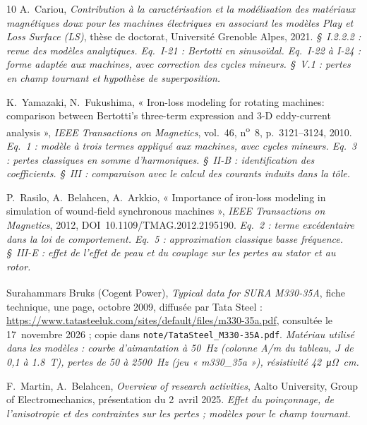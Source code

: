 \documentclass[11pt,a4paper]{article}
\begin{document}
\begin{thebibliography}{10}
 A.~Cariou, \emph{Contribution à la caractérisation et la modélisation des matériaux magnétiques doux pour les machines électriques en associant les modèles Play et Loss Surface (LS)}, thèse de doctorat, Université Grenoble Alpes, 2021. \emph{\S~I.2.2.2 : revue des modèles analytiques. Eq.~I-21 : Bertotti en sinusoïdal. Eq.~I-22 à I-24 : forme adaptée aux machines, avec correction des cycles mineurs. \S~V.1 : pertes en champ tournant et hypothèse de superposition.}

 K.~Yamazaki, N.~Fukushima, « Iron-loss modeling for rotating machines: comparison between Bertotti's three-term expression and 3-D eddy-current analysis », \emph{IEEE Transactions on Magnetics}, vol.~46, n\textsuperscript{o}~8, p.~3121--3124, 2010. \emph{Eq.~1 : modèle à trois termes appliqué aux machines, avec cycles mineurs. Eq.~3 : pertes classiques en somme d'harmoniques. \S~II-B : identification des coefficients. \S~III : comparaison avec le calcul des courants induits dans la tôle.}

 P.~Rasilo, A.~Belahcen, A.~Arkkio, « Importance of iron-loss modeling in simulation of wound-field synchronous machines », \emph{IEEE Transactions on Magnetics}, 2012, DOI~10.1109/TMAG.2012.2195190. \emph{Eq.~2 : terme excédentaire dans la loi de comportement. Eq.~5 : approximation classique basse fréquence. \S~III-E : effet de l'effet de peau et du couplage sur les pertes au stator et au rotor.}

 Surahammars Bruks (Cogent Power), \emph{Typical data for SURA\textsuperscript{\textregistered} M330-35A}, fiche technique, une page, octobre 2009, diffusée par Tata Steel : \url{https://www.tatasteeluk.com/sites/default/files/m330-35a.pdf}, consultée le 17~novembre 2026 ; copie dans \texttt{note/TataSteel\_M330-35A.pdf}. \emph{Matériau utilisé dans les modèles : courbe d'aimantation à \SI{50}{\hertz} (colonne A/m du tableau, $J$ de 0,1 à \SI{1.8}{\tesla}), pertes de 50 à \SI{2500}{\hertz} (jeu « m330\_35a »), résistivité \SI{42}{\micro\ohm\centi\metre}.}

 F.~Martin, A.~Belahcen, \emph{Overview of research activities}, Aalto University, Group of Electromechanics, présentation du 2~avril 2025. \emph{Effet du poinçonnage, de l'anisotropie et des contraintes sur les pertes ; modèles pour le champ tournant.}
\end{thebibliography}
\end{document}
